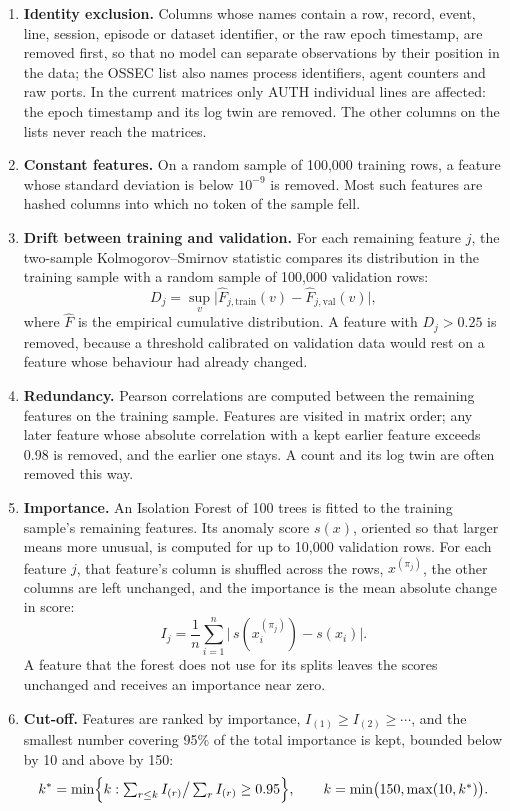 \documentclass[11pt,a4paper]{article}
\begin{document}
\begin{enumerate}
\item \textbf{Identity exclusion.} Columns whose names contain a row, record, event, line, session, episode or dataset identifier, or the raw epoch timestamp, are removed first, so that no model can separate observations by their position in the data; the OSSEC list also names process identifiers, agent counters and raw ports. In the current matrices only AUTH individual lines are affected: the epoch timestamp and its log twin are removed. The other columns on the lists never reach the matrices.
\item \textbf{Constant features.} On a random sample of 100,000 training rows, a feature whose standard deviation is below \(10^{-9}\) is removed. Most such features are hashed columns into which no token of the sample fell.
\item \textbf{Drift between training and validation.} For each remaining feature \(j\), the two-sample Kolmogorov--Smirnov statistic compares its distribution in the training sample with a random sample of 100,000 validation rows:
\begin{equation}
\label{eq:18}
D_j=\sup_v\bigl|\widehat{F}_{j,\mathrm{train}}(v)-\widehat{F}_{j,\mathrm{val}}(v)\bigr|,
\end{equation}
where \(\widehat{F}\) is the empirical cumulative distribution. A feature with \(D_j>0.25\) is removed, because a threshold calibrated on validation data would rest on a feature whose behaviour had already changed.
\item \textbf{Redundancy.} Pearson correlations are computed between the remaining features on the training sample. Features are visited in matrix order; any later feature whose absolute correlation with a kept earlier feature exceeds 0.98 is removed, and the earlier one stays. A count and its log twin are often removed this way.
\item \textbf{Importance.} An Isolation Forest of 100 trees is fitted to the training sample's remaining features. Its anomaly score \(s(x)\), oriented so that larger means more unusual, is computed for up to 10,000 validation rows. For each feature \(j\), that feature's column is shuffled across the rows, \(x^{(\pi_j)}\), the other columns are left unchanged, and the importance is the mean absolute change in score:
\begin{equation}
\label{eq:19}
I_j=\frac{1}{n}\sum_{i=1}^{n}\bigl|\,s(x_i^{(\pi_j)})-s(x_i)\bigr|.
\end{equation}
A feature that the forest does not use for its splits leaves the scores unchanged and receives an importance near zero.
\item \textbf{Cut-off.} Features are ranked by importance, \(I_{(1)}\ge I_{(2)}\ge\cdots\), and the smallest number covering 95\% of the total importance is kept, bounded below by 10 and above by 150:
\begin{equation}
\label{eq:20}
k^*=\min\Bigl\{k:\textstyle\sum_{r\le k}I_{(r)}\big/\sum_{r}I_{(r)}\ge0.95\Bigr\},\qquad k=\min\bigl(150,\max(10,k^*)\bigr).
\end{equation}
\end{enumerate}
\end{document}
